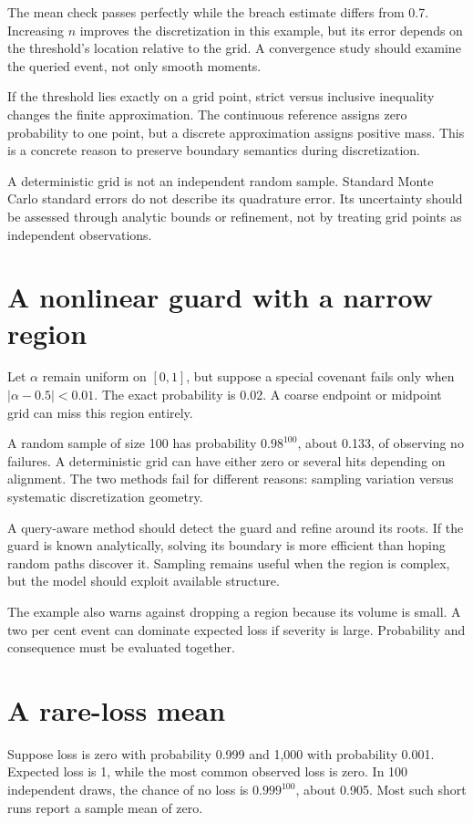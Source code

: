 The mean check passes perfectly while the breach estimate differs from 0.7. Increasing $n$ improves the discretization in this example, but its error depends on the threshold's location relative to the grid. A convergence study should examine the queried event, not only smooth moments.

If the threshold lies exactly on a grid point, strict versus inclusive inequality changes the finite approximation. The continuous reference assigns zero probability to one point, but a discrete approximation assigns positive mass. This is a concrete reason to preserve boundary semantics during discretization.

A deterministic grid is not an independent random sample. Standard Monte Carlo standard errors do not describe its quadrature error. Its uncertainty should be assessed through analytic bounds or refinement, not by treating grid points as independent observations.

\section{A nonlinear guard with a narrow region}
Let $\alpha$ remain uniform on $[0,1]$, but suppose a special covenant fails only when $|\alpha-0.5|<0.01$. The exact probability is 0.02. A coarse endpoint or midpoint grid can miss this region entirely.

A random sample of size 100 has probability $0.98^{100}$, about 0.133, of observing no failures. A deterministic grid can have either zero or several hits depending on alignment. The two methods fail for different reasons: sampling variation versus systematic discretization geometry.

A query-aware method should detect the guard and refine around its roots. If the guard is known analytically, solving its boundary is more efficient than hoping random paths discover it. Sampling remains useful when the region is complex, but the model should exploit available structure.

The example also warns against dropping a region because its volume is small. A two per cent event can dominate expected loss if severity is large. Probability and consequence must be evaluated together.

\section{A rare-loss mean}
Suppose loss is zero with probability 0.999 and 1,000 with probability 0.001. Expected loss is 1, while the most common observed loss is zero. In 100 independent draws, the chance of no loss is $0.999^{100}$, about 0.905. Most such short runs report a sample mean of zero.

